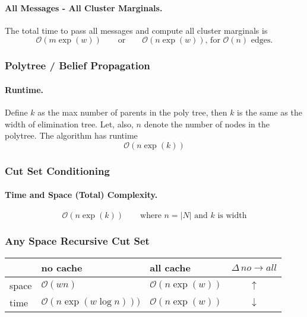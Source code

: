 \documentclass[11pt]{article}
\begin{document}
\paragraph{All Messages - All Cluster Marginals.} The total time to pass all messages and compute all cluster marginals is 
\begin{equation}
	\mathcal O (m \exp (w)) \quad \quad \text{or} \quad \quad \mathcal O (n \exp( w))\text{, for $\mathcal O (n)$ edges.} 
\end{equation}

\subsubsection{Polytree / Belief Propagation}
\paragraph{Runtime.} Define $k$ as the max number of parents in the poly tree, then $k$ is the same as the width of elimination tree. Let, also, $n$ denote the number of nodes in the polytree. The algorithm has runtime 
\begin{equation}
	\mathcal O (n \exp (k))
\end{equation}

\subsubsection{Cut Set Conditioning}
\paragraph{Time and Space (Total) Complexity.}
\begin{equation}
	\mathcal O (n \exp (k))\quad \quad \text{where $n = |N|$ and $k$ is width}
\end{equation}

\subsubsection{Any Space Recursive Cut Set}
\begin{table}[H]
\centering
\begin{tabular}{l|l|l|c} \label{tab:anytime comparison}
      & no cache                           & all cache                 & $\Delta\, no \rightarrow all$ \\ \hline
space & $\mathcal O (wn)$                  & $\mathcal O (n \exp (w))$ & $\uparrow$       \\
time  & $\mathcal O (n \exp (w \log n )))$ & $\mathcal O (n \exp (w))$ & $\downarrow$    
\end{tabular}
\end{table}
\end{document}
